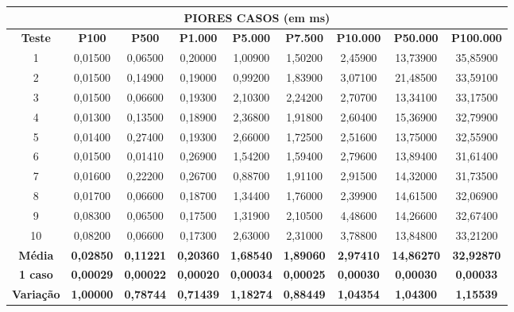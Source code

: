 \documentclass[a4paper, 12pt]{article}
\begin{document}
\begin{tabular}{ccccccccc}

                                                                   \multicolumn{ 9}{c}{{\bf PIORES CASOS (em ms)}} \\
\hline
{\bf Teste} & {\bf P100} & {\bf P500} & {\bf P1.000} & {\bf P5.000} & {\bf P7.500} & {\bf P10.000} & {\bf P50.000} & {\bf P100.000} \\
\hline
         1 &    0,01500 &    0,06500 &    0,20000 &    1,00900 &    1,50200 &    2,45900 &   13,73900 &   35,85900 \\
\hline
         2 &    0,01500 &    0,14900 &    0,19000 &    0,99200 &    1,83900 &    3,07100 &   21,48500 &   33,59100 \\
\hline
         3 &    0,01500 &    0,06600 &    0,19300 &    2,10300 &    2,24200 &    2,70700 &   13,34100 &   33,17500 \\
\hline
         4 &    0,01300 &    0,13500 &    0,18900 &    2,36800 &    1,91800 &    2,60400 &   15,36900 &   32,79900 \\
\hline
         5 &    0,01400 &    0,27400 &    0,19300 &    2,66000 &    1,72500 &    2,51600 &   13,75000 &   32,55900 \\
\hline
         6 &    0,01500 &    0,01410 &    0,26900 &    1,54200 &    1,59400 &    2,79600 &   13,89400 &   31,61400 \\
\hline
         7 &    0,01600 &    0,22200 &    0,26700 &    0,88700 &    1,91100 &    2,91500 &   14,32000 &   31,73500 \\
\hline
         8 &    0,01700 &    0,06600 &    0,18700 &    1,34400 &    1,76000 &    2,39900 &   14,61500 &   32,06900 \\
\hline
         9 &    0,08300 &    0,06500 &    0,17500 &    1,31900 &    2,10500 &    4,48600 &   14,26600 &   32,67400 \\
\hline
        10 &    0,08200 &    0,06600 &    0,17300 &    2,63000 &    2,31000 &    3,78800 &   13,84800 &   33,21200 \\
\hline
{\bf Média} & {\bf 0,02850} & {\bf 0,11221} & {\bf 0,20360} & {\bf 1,68540} & {\bf 1,89060} & {\bf 2,97410} & {\bf 14,86270} & {\bf 32,92870} \\
\hline
{\bf 1 caso} & {\bf 0,00029} & {\bf 0,00022} & {\bf 0,00020} & {\bf 0,00034} & {\bf 0,00025} & {\bf 0,00030} & {\bf 0,00030} & {\bf 0,00033} \\
\hline
{\bf Variação} & {\bf 1,00000} & {\bf 0,78744} & {\bf 0,71439} & {\bf 1,18274} & {\bf 0,88449} & {\bf 1,04354} & {\bf 1,04300} & {\bf 1,15539} \\
\hline
\end{tabular}  
\vspace{0.3cm}
\end{document}
